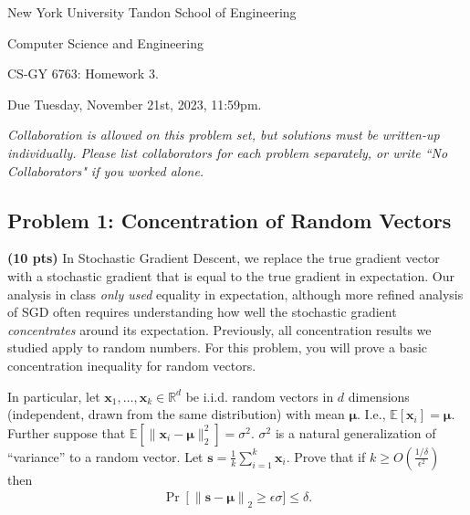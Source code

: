 \documentclass[10pt]{article}
\newcommand{\bs}[1]{\boldsymbol{#1}}
\newcommand{\bv}[1]{\mathbf{#1}}
\newcommand{\R}{\mathbb{R}}
\newcommand{\E}{\mathbb{E}}
\begin{document}
	
\begin{center}
	\normalsize
	New York University Tandon School of Engineering
	
	Computer Science and Engineering
	\medskip
	
	\large
	CS-GY 6763: Homework 3. 
	
	Due Tuesday, November 21st, 2023, 11:59pm.
	\medskip
	
	\normalsize 
	\noindent \emph{Collaboration is allowed on this problem set, but solutions must be written-up individually. Please list collaborators for each problem separately, or write ``No Collaborators" if you worked alone.}
	\medskip
\end{center} 

\subsection{Problem 1: Concentration of Random Vectors}
\textbf{(10 pts)} In Stochastic Gradient Descent, we replace the true gradient vector with a stochastic gradient that is equal to the true gradient in expectation. Our analysis in class \emph{only used} equality in expectation, although more refined analysis of SGD often requires understanding how well the stochastic gradient \emph{concentrates} around its expectation. Previously, all concentration results we studied apply to random numbers.  For this problem, you will prove a basic concentration inequality for random vectors. 

In particular, let $\bv{x}_1, \ldots, \bv{x}_k \in \R^d$ be i.i.d. random vectors in $d$ dimensions (independent, drawn from the same distribution) with mean $\bs{\mu}$. I.e., $\E[\bv{x}_i] = \bs{\mu}$. Further suppose that $\E\left[\|\bv{x}_i - \bs{\mu}\|_2^2\right] = \sigma^2$. $\sigma^2$ is a natural generalization of ``variance'' to a random vector. Let $\bv{s} = \frac{1}{k}\sum_{i=1}^k\bv{x}_i$. Prove that if $k \geq O(\frac{1/\delta}{\epsilon^2})$ then
\begin{align*}
	\Pr\left[\|\bv{s} - \bs{\mu}\right\|_2 \geq \epsilon \sigma] \leq \delta.
\end{align*}
\end{document}
